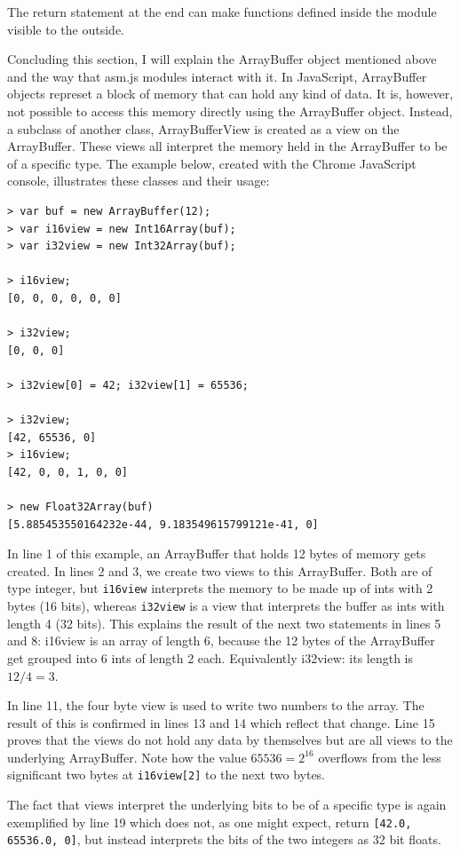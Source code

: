\documentclass[11pt]{report}
\begin{document}
The return statement at the end can make functions defined inside the module visible to the outside.

Concluding this section, I will explain the ArrayBuffer object mentioned above and the way that asm.js modules interact with it. In JavaScript, ArrayBuffer objects represet a block of memory that can hold any kind of data. It is, however, not possible to access this memory directly using the ArrayBuffer object. Instead, a subclass of another class, ArrayBufferView is created as a view on the ArrayBuffer. These views all interpret the memory held in the ArrayBuffer to be of a specific type. The example below, created with the Chrome JavaScript console, illustrates these classes and their usage:

\begin{lstlisting}
> var buf = new ArrayBuffer(12);
> var i16view = new Int16Array(buf);
> var i32view = new Int32Array(buf);

> i16view;
[0, 0, 0, 0, 0, 0]

> i32view;
[0, 0, 0]

> i32view[0] = 42; i32view[1] = 65536;

> i32view;
[42, 65536, 0]
> i16view;
[42, 0, 0, 1, 0, 0]

> new Float32Array(buf)
[5.885453550164232e-44, 9.183549615799121e-41, 0]
\end{lstlisting}

In line 1 of this example, an ArrayBuffer that holds 12 bytes of memory gets created. In lines 2 and 3, we create two views to this ArrayBuffer. Both are of type integer, but \texttt{i16view} interprets the memory to be made up of ints with 2 bytes (16 bits), whereas \texttt{i32view} is a view that interprets the buffer as ints with length 4 (32 bits). This explains the result of the next two statements in lines 5 and 8: i16view is an array of length 6, because the 12 bytes of the ArrayBuffer get grouped into 6 ints of length 2 each. Equivalently i32view: its length is $12/4 = 3$.

In line 11, the four byte view is used to write two numbers to the array. The result of this is confirmed in lines 13 and 14 which reflect that change. Line 15 proves that the views do not hold any data by themselves but are all views to the underlying ArrayBuffer. Note how the value $65536 = 2^{16}$ overflows from the less significant two bytes at \texttt{i16view[2]} to the next two bytes.

The fact that views interpret the underlying bits to be of a specific type is again exemplified by line 19 which does not, as one might expect, return \texttt{[42.0, 65536.0, 0]}, but instead interprets the bits of the two integers as 32 bit floats.
\end{document}
